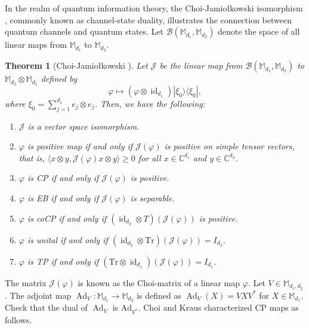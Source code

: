\documentclass[11pt,reqno]{amsart}
\theoremstyle{definition}
\theoremstyle{plain}
\newtheorem{thm}[defn]{Theorem}
\theoremstyle{remark}
\numberwithin{equation}{section}%
\begin{document}
   In the realm of quantum information theory, the Choi-Jamio\l kowski isomorphism \cite{Cho75, Jam72}, commonly known as channel-state duality, illustrates the connection between quantum channels and quantum states. Let $\mathcal{B}({\mathbb{M}_{d_1},\mathbb{M}_{d_2}})$ denote the space of all linear maps from $\mathbb{M}_{d_1}$ to $\mathbb{M}_{d_2}$. 
 
 
 
 \begin{thm}[Choi-Jamio\l kowski \cite{Cho75, Jam72}]\label{CJ isomorphism}
 	Let $\mathcal{J}$ be the linear map from $\mathcal{B}({\mathbb{M}_{d_1},\mathbb{M}_{d_2}})$ to $\mathbb{M}_{d_2}\otimes\mathbb{M}_{d_1}$ defined by 
 	$$\varphi\mapsto(\varphi\otimes\operatorname{id}_{d_1})|\xi_0\rangle\langle\xi_0|,$$
 	where $\xi_0=\sum_{j=1}^{d_1} e_j\otimes e_j$. Then, we have the following:
 	
 	\begin{enumerate}
 		\item $\mathcal{J}$ is a vector space isomorphism. 
 		\item $\varphi$ is positive map if and only if $\mathcal{J}(\varphi)$ is positive on simple tensor vectors, that is, $\langle x\otimes y, \mathcal{J}(\varphi)x\otimes y\rangle\geq 0$ for all $x\in\mathbb{C}^{d_1}$ and $y\in\mathbb{C}^{d_2}$. 
 		\item $\varphi$ is CP if and only if $\mathcal{J}(\varphi)$ is positive.
        \item $\varphi$ is EB if and only if $\mathcal{J}(\varphi)$ is separable.
        \item $\varphi$ is coCP if and only if $(\operatorname{id}_{d_2}\otimes T)(\mathcal{J}(\varphi))$ is positive.
 		\item $\varphi$ is unital if and only if $(\operatorname{id}_{d_2}\otimes\text{Tr})(\mathcal{J}(\varphi))=I_{d_2}$.
 		\item $\varphi$ is TP if and only if $(\text{Tr}\otimes \operatorname{id}_{d_1})(\mathcal{J}(\varphi))=I_{d_1}$.
 	\end{enumerate}
 \end{thm}
 
 
 The matrix $\mathcal{J}(\varphi)$ is known as the Choi-matrix of a linear map $\varphi$. Let $V\in\mathbb{M}_{d_1,d_2}$. The adjoint map $\operatorname{Ad}_V:\mathbb{M}_{d_1}\rightarrow\mathbb{M}_{d_2}$ is defined as $\operatorname{Ad}_V(X)=VXV^*$ for $X\in\mathbb{M}_{d_1}$. Check that the dual of $\operatorname{Ad}_V$ is $\text{Ad}_{V^*}$. Choi \cite{Cho75} and Kraus \cite{Kra71} characterized CP maps as follows.
 
\end{document}
